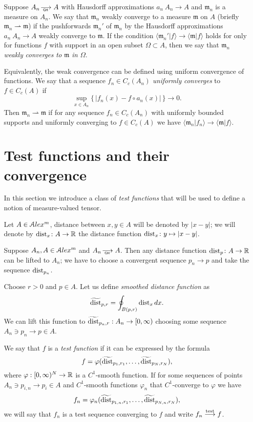 Suppose $A_n\GHto A$ with Hausdorff approximations $a_n\:A_n\to A$ and
$\mathfrak m_n$ is a measure on $A_n$.
We say that $\mathfrak m_n$ weakly converge to a measure $\mathfrak m$ on $A$ (briefly $\mathfrak m_n\rightharpoonup \mathfrak m$) if the pushforwards $\mathfrak m_n'$ of $\mathfrak m_n$  by the Hausdorff approximations $a_n\:A_n\to A$ weakly converge to 
$\mathfrak m$.
If the condition $\langle \mathfrak m_n'|f\rangle \to \langle \mathfrak m|f\rangle $ holds for only for functions $f$ with support in an open subset $\Omega\subset A$, then we say that $\mathfrak m_n$ \emph{weakly converges to $\mathfrak m$ in $\Omega$}.

Equivalently, the weak convergence can be defined using uniform convergence of functions.
We say that  a sequence $f_n\in C_c(A_n)$
\emph{uniformly converges} to $f\in C_c(A)$
if 
\[\sup_{x\in A_n}\{\,|f_n(x)-f\circ a_n(x)|\,\}\to 0.\]
Then  $\mathfrak m_n\rightharpoonup \mathfrak m$
if for any sequence $f_n\in C_c(A_n)$
with uniformly bounded supports and
uniformly converging to $f\in C_c(A)$
we have $\langle \mathfrak m_n|f_n\rangle \to \langle \mathfrak m|f\rangle $.


\section{Test functions and their convergence}

In this section we introduce a class of \emph{test functions} that will be used to define  a notion of measure-valued tensor.

Let $A\in \mathcal{A}lex^m$, distance between $x,y\in A$ will be denoted by $|x-y|$;
we will denote by $\operatorname{\rm dist}_x\colon A\to \mathbb{R}$ the distance function $\operatorname{\rm dist}_x\colon y\mapsto |x-y|$.

Suppose $A_n, A\in \mathcal{A}lex^m$ and  $A_n\GHto A$.
Then any distance function $\dist_p\:A\zz\to\RR$ can be lifted to $A_n$;
we have to choose a convergent sequence $p_n\to p$ and take the
sequence $\operatorname{\rm dist}_{p_n}$.

Choose $r>0$ and $p\in A$.
Let us define \emph{smoothed distance function} as 
$$\widetilde{\operatorname{\rm dist}}_{p,r} =\oint_{B(p,r)} \operatorname{\rm dist}_{x}dx.$$ 
We can lift this function to
$\widetilde{\operatorname{\rm dist}}_{p_n,r}:A_n\to [0,\infty)$
choosing some  sequence $A_n\ni p_n\to p\in A$.

We say that $f$ is a \emph{test function} if it can be expressed by the formula
$$f=\varphi( \widetilde{\operatorname{\rm dist}}_{p_1,r_1}, \dots,   \widetilde{\operatorname{\rm dist}}_{p_N,r_N}),$$
where $\varphi:[0,\infty)^N\to\mathbb{R}$ is a $C^1$-smooth function.
If for some sequences of points $A_n\ni p_{i,n}\to p_i\in A$ and $C^1$-smooth functions $\varphi_n$ that $C^1$-converge to $\varphi$ we have
$$f_n=\varphi_n( \widetilde{\operatorname{\rm dist}}_{p_{1,n},r_1},\dots,   \widetilde{\operatorname{\rm dist}}_{p_{N,n},r_N}),$$
we will say that $f_n$ is a test sequence converging to $f$ and write $f_n\stackrel{\tiny\rm test}{\longrightarrow} f$.

